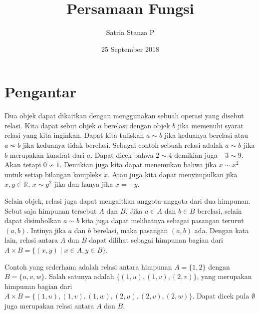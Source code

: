\documentclass{article}
\begin{document}
\title{Persamaan Fungsi}
\author{Satria Stanza P}
\date{25 September 2018}
\maketitle

\renewcommand*\contentsname{Daftar Isi}
\tableofcontents

\section{Pengantar}

Dua objek dapat dikaitkan dengan menggunakan sebuah operasi yang disebut relasi. Kita dapat sebut objek $a$ berelasi dengan objek $b$ jika memenuhi syarat relasi yang kita inginkan. Dapat kita tuliskan $a \sim b$ jika keduanya berelasi atau $a \nsim b$ jika keduanya tidak berelasi. Sebagai contoh sebuah relasi adalah $a \sim b$ jika $b$ merupakan kuadrat dari $a$. Dapat dicek bahwa $2 \sim 4$ demikian juga $-3 \sim 9$. Akan tetapi $0 \nsim 1$. Demikian juga kita dapat menemukan bahwa jika $x \sim x^2$ untuk setiap bilangan kompleks $x$. Atau juga kita dapat menyimpulkan jika $x, y \in \mathbb{R}$, $x \sim y^2$ jika dan hanya jika $x = -y$.

Selain objek, relasi juga dapat mengaitkan anggota-anggota dari dua himpunan. Sebut saja himpunan tersebut $A$ dan $B$. Jika $a \in A$ dan $b \in B$ berelasi, selain dapat disimbolkan $a \sim b$ kita juga dapat melihatnya sebagai pasangan terurut $(a,b)$. Intinya jika $a$ dan $b$ berelasi, maka pasangan $(a,b)$ ada. Dengan kata lain, relasi antara $A$ dan $B$ dapat dilihat sebagai himpunan bagian dari $A \times B = \{(x,y) \mid x \in A, y \in B\}$.

Contoh yang sederhana adalah relasi antara himpunan $A = \{1,2\}$ dengan $B = \{u,v,w\}$. Salah satunya adalah $\{(1,u), (1,v), (2,v)\}$, yang merupakan himpunan bagian dari\\ $A \times B = \{(1,u), (1,v), (1,w), (2,u), (2,v), (2,w)\}$. Dapat dicek pula $\emptyset$ juga merupakan relasi antara $A$ dan $B$.
\end{document}

